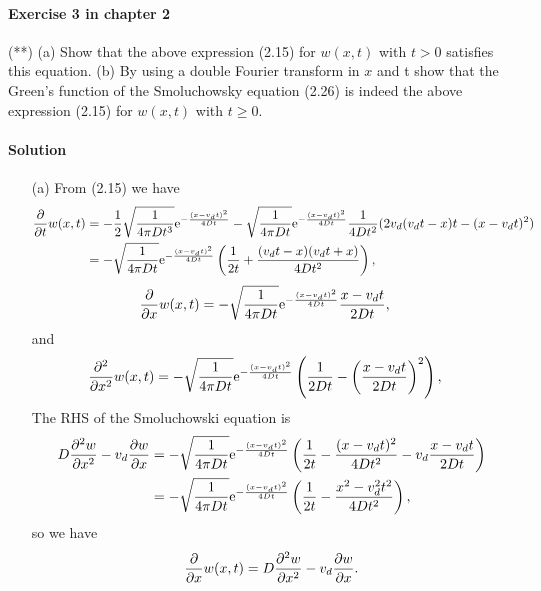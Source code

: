 \documentclass[hyperref, a4paper]{article}
\newcommand*{\ee}{\mathrm{e}}
\begin{document}
\paragraph{Exercise 3 in chapter 2} (**)  (a) Show that the above expression (2.15) for $w(x, t)$ with $t>0$ satisfies this equation. (b) By using a double Fourier transform in $x$ and t show that the Green's function of the Smoluchowsky equation (2.26) is indeed the above expression (2.15) for $w(x, t)$ with $t \geq 0$.

\paragraph{Solution} \begin{itemize}
\item[(a)] From (2.15) we have 
\[
    \begin{aligned}
        \pdv{t} w(x, t) &= 
        - \frac{1}{2} \sqrt{\frac{1}{4 \pi D t^3}} \ee^{- \frac{(x - v_d t)^2}{4 D t}} 
        - \sqrt{\frac{1}{4 \pi D t}} \ee^{- \frac{(x - v_d t)^2}{4 D t}} \frac{1}{4 D t^2} 
        (2 v_d (v_d t - x) t - (x- v_d t)^2 ) \\
        &= - \sqrt{\frac{1}{4 \pi D t}} \ee^{- \frac{(x - v_d t)^2}{4 D t}} 
        \left( \frac{1}{2 t} + \frac{(v_d t - x) (v_d t + x)}{4 D t^2} \right),
    \end{aligned}
\]
\[
    \begin{aligned}
        \pdv{x}w(x, t) &= - \sqrt{\frac{1}{4 \pi D t}} \ee^{- \frac{(x - v_d t)^2}{4 D t}} 
        \frac{x - v_d t}{2 D t},
    \end{aligned}
\]
and 
\[
    \begin{aligned}
        \pdv[2]{x}w(x, t) &= - \sqrt{\frac{1}{4 \pi D t}} \ee^{- \frac{(x - v_d t)^2}{4 D t}} 
        \left(
            \frac{1}{2 D t} - \left( \frac{x - v_d t}{2 D t} \right)^2
        \right),
    \end{aligned}
\]
The RHS of the Smoluchowski equation is 
\[
    \begin{aligned}
        D \pdv[2]{w}{x} - v_d \pdv{w}{x} &= - \sqrt{\frac{1}{4 \pi D t}} \ee^{- \frac{(x - v_d t)^2}{4 D t}} 
        \left(
            \frac{1}{2 t} - \frac{(x - v_d t)^2}{4 D t^2} - v_d \frac{x - v_d t}{2 D t}
        \right) \\
        &= - \sqrt{\frac{1}{4 \pi D t}} \ee^{- \frac{(x - v_d t)^2}{4 D t}} 
        \left(
            \frac{1}{2 t} - \frac{x^2 - v_d^2 t^2}{4 D t^2}
        \right),
    \end{aligned}
\]
so we have 
\[
    \pdv{x}w(x, t) = D \pdv[2]{w}{x} - v_d \pdv{w}{x} .
\]


\end{itemize}
\end{document}
